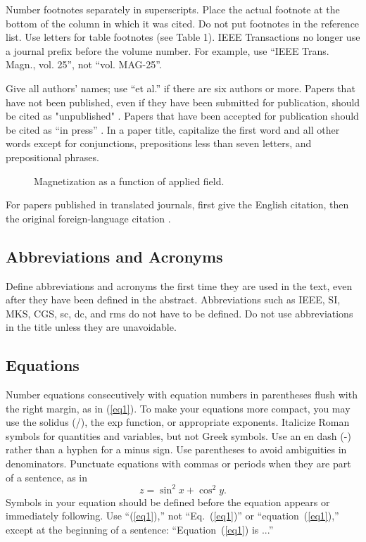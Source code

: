 Number footnotes separately in superscripts. Place the actual footnote at
the bottom of the column in which it was cited. Do not put footnotes in
the reference list. Use letters for table footnotes (see Table 1). IEEE
Transactions no longer use a journal prefix before the volume number. For
example, use ``IEEE Trans. Magn., vol. 25'', not ``vol. MAG-25''.

Give all authors' names; use ``et al.'' if there are six authors or more.
Papers that have not been published, even if they have been submitted for
publication, should be cited as "unpublished" \cite{elissa}. Papers that
have been accepted for publication should be cited as ``in press''
\cite{nicole}. In a paper title, capitalize the first word and all other
words except for conjunctions, prepositions less than seven letters, and
prepositional phrases.

\begin{figure}[t]
 \centering
\caption{Magnetization as a function of applied field.} \label{figure1}
\end{figure}

For papers published in translated journals, first give the English
citation, then the original foreign-language citation \cite{yorozu}.


\subsection{Abbreviations and Acronyms}

Define abbreviations and acronyms the first time they are used in the
text, even after they have been defined in the abstract. Abbreviations
such as IEEE, SI, MKS, CGS, sc, dc, and rms do not have to be defined. Do
not use abbreviations in the title unless they are unavoidable.

\subsection{Equations}

Number equations consecutively with equation numbers in
parentheses flush with the right margin, as in (\ref{eq1}). To
make your equations more compact, you may use the solidus (/), the
exp function, or appropriate exponents. Italicize Roman symbols
for quantities and variables, but not Greek symbols. Use an en
dash (-) rather than a hyphen for a minus sign. Use parentheses to
avoid ambiguities in denominators. Punctuate equations with commas
or periods when they are part of a sentence, as in
\begin{equation}
 z = \sin^2 x + \cos^2 y.  \label{eq1}
\end{equation}
Symbols in your equation should be defined before the equation
appears or immediately following. Use ``(\ref{eq1}),'' not
``Eq.~(\ref{eq1})'' or ``equation~(\ref{eq1}),'' except at the
beginning of a sentence: ``Equation~(\ref{eq1}) is ...''


